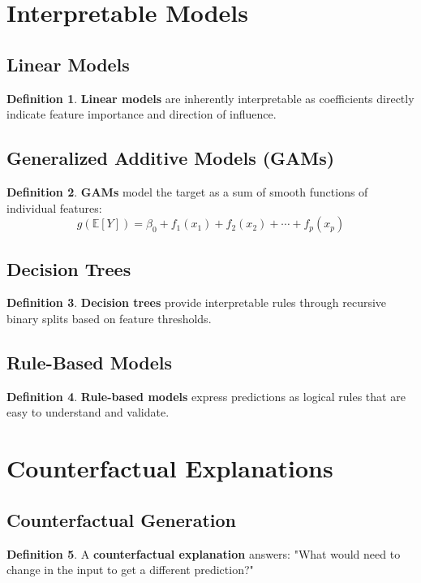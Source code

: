 \documentclass[11pt]{article}
\theoremstyle{definition}
\newtheorem{definition}{Definition}[section]
\begin{document}
\section{Interpretable Models}

\subsection{Linear Models}
\begin{definition}
\textbf{Linear models} are inherently interpretable as coefficients directly indicate feature importance and direction of influence.
\end{definition}

\subsection{Generalized Additive Models (GAMs)}
\begin{definition}
\textbf{GAMs} model the target as a sum of smooth functions of individual features:
$$g(\mathbb{E}[Y]) = \beta_0 + f_1(x_1) + f_2(x_2) + \cdots + f_p(x_p)$$
\end{definition}

\subsection{Decision Trees}
\begin{definition}
\textbf{Decision trees} provide interpretable rules through recursive binary splits based on feature thresholds.
\end{definition}

\subsection{Rule-Based Models}
\begin{definition}
\textbf{Rule-based models} express predictions as logical rules that are easy to understand and validate.
\end{definition}

\section{Counterfactual Explanations}

\subsection{Counterfactual Generation}
\begin{definition}
A \textbf{counterfactual explanation} answers: "What would need to change in the input to get a different prediction?"
\end{definition}
\end{document}
